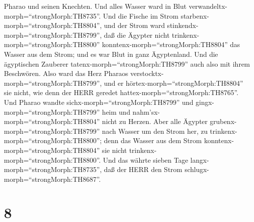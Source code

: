 Pharao und seinen Knechten. Und alles Wasser ward in Blut
verwandeltx-morph=``strongMorph:TH8735''.  Und die Fische
im Strom starbenx-morph=``strongMorph:TH8804'', und der Strom ward
stinkendx-morph=``strongMorph:TH8799'', daß die Ägypter nicht
trinkenx-morph=``strongMorph:TH8800''
konntenx-morph=``strongMorph:TH8804'' das Wasser aus dem Strom; und es
war Blut in ganz Ägyptenland.  Und die ägyptischen Zauberer
tatenx-morph=``strongMorph:TH8799'' auch also mit ihrem Beschwören. Also
ward das Herz Pharaos verstocktx-morph=``strongMorph:TH8799'', und er
hörtex-morph=``strongMorph:TH8804'' sie nicht, wie denn der HERR geredet
hattex-morph=``strongMorph:TH8765''.  Und Pharao wandte
sichx-morph=``strongMorph:TH8799'' und
gingx-morph=``strongMorph:TH8799'' heim und
nahm'sx-morph=``strongMorph:TH8804'' nicht zu Herzen.  Aber
alle Ägypter grubenx-morph=``strongMorph:TH8799'' nach Wasser um den
Strom her, zu trinkenx-morph=``strongMorph:TH8800''; denn das Wasser aus
dem Strom konntenx-morph=``strongMorph:TH8804'' sie nicht
trinkenx-morph=``strongMorph:TH8800''.  Und das währte
sieben Tage langx-morph=``strongMorph:TH8735'', daß der HERR den Strom
schlugx-morph=``strongMorph:TH8687''.

\hypertarget{section-7}{%
\section{8}\label{section-7}}

